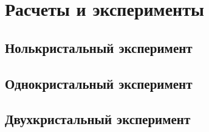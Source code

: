 \section{Расчеты и эксперименты}
\subsection{Нолькристальный эксперимент}
\subsection{Однокристальный эксперимент}
\subsection{Двухкристальный эксперимент}
  
  
  
